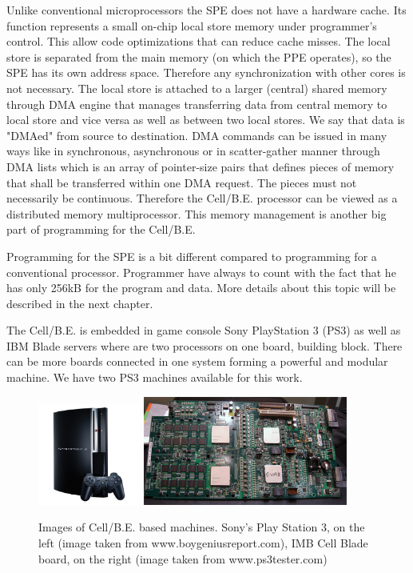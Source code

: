 \par
Unlike conventional microprocessors the SPE does not have a hardware cache.
Its function represents a small on-chip local store memory under programmer's control.
This allow code optimizations that can reduce cache misses.
The local store is separated from the main memory (on which the PPE operates), so the SPE has its own address space.
Therefore any synchronization with other cores is not necessary.
The local store is attached to a larger (central) shared memory through DMA engine that manages transferring data from central memory to local store and vice versa as well as between two local stores.
We say that data is "DMAed" from source to destination.
DMA commands can be issued in many ways like in synchronous, asynchronous or in scatter-gather manner through DMA lists which is an array of pointer-size pairs that defines pieces of memory that shall be transferred within one DMA request.
The pieces must not necessarily be continuous.
Therefore the \mbox{Cell/B.E.} processor can be viewed as a distributed memory multiprocessor.
This memory management is another big part of programming for the \mbox{Cell/B.E.}

\par
Programming for the SPE is a bit different compared to programming for a conventional processor.
Programmer have always to count with the fact that he has only 256kB for the program and data.
More details about this topic will be described in the next chapter.

\par
The \mbox{Cell/B.E.} is embedded in game console Sony PlayStation 3 (PS3) as well as IBM Blade servers where are two processors on one board, building block.
There can be more boards connected in one system forming a powerful and modular machine.
We have two PS3 machines available for this work.

\begin{figure}
    \centering
    \includegraphics[width=0.3\textwidth]{data/png/PS3}
    \includegraphics[width=0.6\textwidth]{data/png/ibm-cell-board}
    \caption[\mbox{Cell/B.E.} based machines]{Images of \mbox{Cell/B.E.} based machines.
Sony's Play Station 3, on the left (image taken from www.boygeniusreport.com), IMB Cell Blade board, on the right (image taken from www.ps3tester.com)
}
    \label{fg:cellmachines}
\end{figure}

